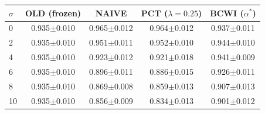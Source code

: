 \begin{tabular}{lcccc}
\toprule
$\sigma$ & OLD (frozen) & NAIVE & PCT ($\lambda{=}0.25$) & BCWI ($\alpha^*$) \\
\midrule
0 & 0.935$\pm$0.010 & 0.965$\pm$0.012 & 0.964$\pm$0.012 & 0.937$\pm$0.011 \\
2 & 0.935$\pm$0.010 & 0.951$\pm$0.011 & 0.952$\pm$0.010 & 0.944$\pm$0.010 \\
4 & 0.935$\pm$0.010 & 0.923$\pm$0.012 & 0.921$\pm$0.018 & 0.941$\pm$0.009 \\
6 & 0.935$\pm$0.010 & 0.896$\pm$0.011 & 0.886$\pm$0.015 & 0.926$\pm$0.011 \\
8 & 0.935$\pm$0.010 & 0.869$\pm$0.008 & 0.859$\pm$0.013 & 0.907$\pm$0.013 \\
10 & 0.935$\pm$0.010 & 0.856$\pm$0.009 & 0.834$\pm$0.013 & 0.901$\pm$0.012 \\
\bottomrule
\end{tabular}
